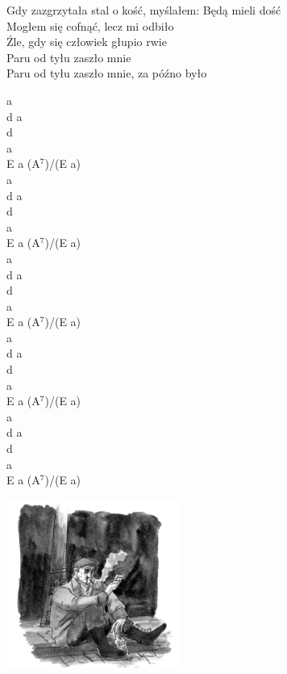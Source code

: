\documentclass[a5paper, 10pt]{book}
\begin{document}
\begin{minipage}[t]{0.81\textwidth}
  Gdy zazgrzytała stal o kość, myślałem: Będą mieli dość\\
  Mogłem się cofnąć, lecz mi odbiło\\
  \hspace*{5mm}Źle, gdy się człowiek głupio rwie\\
  \hspace*{5mm}Paru od tyłu zaszło mnie\\
  \hspace*{5mm}Paru od tyłu zaszło mnie, za późno było\\
\end{minipage}
\begin{minipage}[t]{0.19\textwidth}
  a\\
  d a\\
  d\\
  a\\
  E a (A$^7$)/(E a)\\

  a\\
  d a\\
  d\\
  a\\
  E a (A$^7$)/(E a)\\

  a\\
  d a\\
  d\\
  a\\
  E a (A$^7$)/(E a)\\

  a\\
  d a\\
  d\\
  a\\
  E a (A$^7$)/(E a)\\

  a\\
  d a\\
  d\\
  a\\
  E a (A$^7$)/(E a)\\

\end{minipage}
\includegraphics[height=5.5cm,center]{images/bandyta.png}
\end{document}
